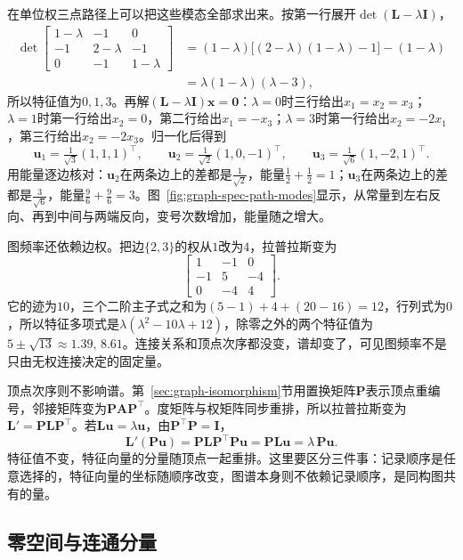 在单位权三点路径上可以把这些模态全部求出来。按第一行展开$\det(\bm L-\lambda\bm I)$，
\[
 \begin{aligned}
 \det\begin{bmatrix}1-\lambda&-1&0\\-1&2-\lambda&-1\\0&-1&1-\lambda\end{bmatrix}
 &=(1-\lambda)\bigl[(2-\lambda)(1-\lambda)-1\bigr]-(1-\lambda)\\
 &=\lambda(1-\lambda)(\lambda-3),
 \end{aligned}
\]
所以特征值为$0,1,3$。再解$(\bm L-\lambda\bm I)\bm x=\bm0$：$\lambda=0$时三行给出$x_1=x_2=x_3$；$\lambda=1$时第一行给出$x_2=0$，第二行给出$x_1=-x_3$；$\lambda=3$时第一行给出$x_2=-2x_1$，第三行给出$x_2=-2x_3$。归一化后得到
\[
 \bm u_1=\tfrac1{\sqrt3}(1,1,1)^{\top},\qquad
 \bm u_2=\tfrac1{\sqrt2}(1,0,-1)^{\top},\qquad
 \bm u_3=\tfrac1{\sqrt6}(1,-2,1)^{\top}.
\]
用能量逐边核对：$\bm u_2$在两条边上的差都是$\tfrac1{\sqrt2}$，能量$\tfrac12+\tfrac12=1$；$\bm u_3$在两条边上的差都是$\tfrac3{\sqrt6}$，能量$\tfrac96+\tfrac96=3$。图~\ref{fig:graph-spec-path-modes}显示，从常量到左右反向、再到中间与两端反向，变号次数增加，能量随之增大。

图频率还依赖边权。把边$\{2,3\}$的权从$1$改为$4$，拉普拉斯变为
\[
 \begin{bmatrix}1&-1&0\\-1&5&-4\\0&-4&4\end{bmatrix}.
\]
它的迹为$10$，三个二阶主子式之和为$(5-1)+4+(20-16)=12$，行列式为$0$，所以特征多项式是$\lambda(\lambda^2-10\lambda+12)$，除零之外的两个特征值为$5\pm\sqrt{13}\approx1.39,\,8.61$。连接关系和顶点次序都没变，谱却变了，可见图频率不是只由无权连接决定的固定量。

顶点次序则不影响谱。第~\ref{sec:graph-isomorphism}节用置换矩阵$\bm P$表示顶点重编号，邻接矩阵变为$\bm P\bm A\bm P^{\top}$。度矩阵与权矩阵同步重排，所以拉普拉斯变为$\bm L'=\bm P\bm L\bm P^{\top}$。若$\bm L\bm u=\lambda\bm u$，由$\bm P^{\top}\bm P=\bm I$，
\[
 \bm L'(\bm P\bm u)=\bm P\bm L\bm P^{\top}\bm P\bm u=\bm P\bm L\bm u=\lambda\,\bm P\bm u .
\]
特征值不变，特征向量的分量随顶点一起重排。这里要区分三件事：记录顺序是任意选择的，特征向量的坐标随顺序改变，图谱本身则不依赖记录顺序，是同构图共有的量。

\subsection{零空间与连通分量}
\label{sec:graph-spec-null-space-components}

